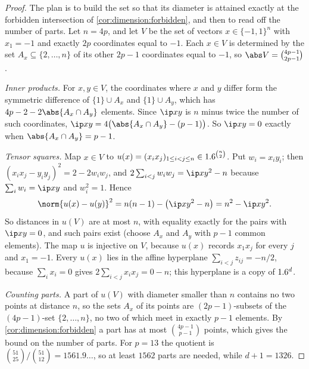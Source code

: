 \begin{refsection}
\begin{proof}
The plan is to build the set so that its diameter is attained exactly at the forbidden intersection of \cref{cor:dimension:forbidden}, and then to read off the number of parts. Let $n=4p$, and let $V$ be the set of vectors $x\in\{-1,1\}^n$ with $x_1=-1$ and exactly $2p$ coordinates equal to $-1$. Each $x\in V$ is determined by the set $A_x\subseteq\{2,\dots,n\}$ of its other $2p-1$ coordinates equal to $-1$, so $\abs V=\binom{4p-1}{2p-1}$.

\emph{Inner products.} For $x,y\in V$, the coordinates where $x$ and $y$ differ form the symmetric difference of $\{1\}\cup A_x$ and $\{1\}\cup A_y$, which has $4p-2-2\abs{A_x\cap A_y}$ elements. Since $\ip xy$ is $n$ minus twice the number of such coordinates, $\ip xy=4\big(\abs{A_x\cap A_y}-(p-1)\big)$. So $\ip xy=0$ exactly when $\abs{A_x\cap A_y}=p-1$.

\emph{Tensor squares.} Map $x\in V$ to $u(x)=(x_ix_j)_{1\le i<j\le n}\in1.6^{\binom n2}$. Put $w_i=x_iy_i$; then $(x_ix_j-y_iy_j)^2=2-2w_iw_j$, and $2\sum_{i<j}w_iw_j=\ip xy^2-n$ because $\sum_iw_i=\ip xy$ and $w_i^2=1$. Hence
\[
\norm{u(x)-u(y)}^2=n(n-1)-\big(\ip xy^2-n\big)=n^2-\ip xy^2 .
\]
So distances in $u(V)$ are at most $n$, with equality exactly for the pairs with $\ip xy=0$, and such pairs exist (choose $A_x$ and $A_y$ with $p-1$ common elements). The map $u$ is injective on $V$, because $u(x)$ records $x_1x_j$ for every $j$ and $x_1=-1$. Every $u(x)$ lies in the affine hyperplane $\sum_{i<j}z_{ij}=-n/2$, because $\sum_ix_i=0$ gives $2\sum_{i<j}x_ix_j=0-n$; this hyperplane is a copy of $1.6^d$.

\emph{Counting parts.} A part of $u(V)$ with diameter smaller than $n$ contains no two points at distance $n$, so the sets $A_x$ of its points are $(2p-1)$-subsets of the $(4p-1)$-set $\{2,\dots,n\}$, no two of which meet in exactly $p-1$ elements. By \cref{cor:dimension:forbidden} a part has at most $\binom{4p-1}{p-1}$ points, which gives the bound on the number of parts. For $p=13$ the quotient is $\binom{51}{25}/\binom{51}{12}=1561.9\ldots$, so at least $1562$ parts are needed, while $d+1=1326$.
\end{proof}



\end{refsection}

